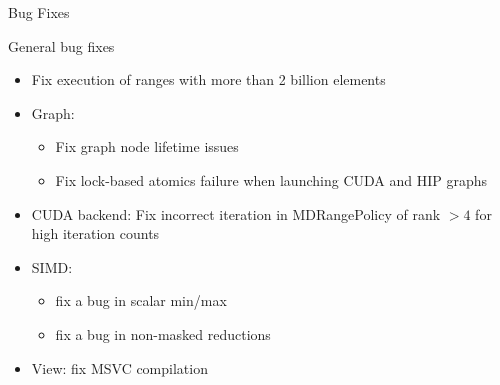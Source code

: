 




\begin{frame}[fragile]

  {\Huge Bug Fixes}

  \vspace{10pt}

\end{frame}

\begin{frame}[fragile]{General bug fixes}
  \begin{itemize}
      \item Fix execution of ranges with more than 2 billion elements
      \item Graph:
      \begin{itemize}
        \item Fix graph node lifetime issues
        \item Fix lock-based atomics failure when launching CUDA and HIP graphs
      \end{itemize}
      \item CUDA backend: Fix incorrect iteration in MDRangePolicy of rank $> 4$ for high iteration counts
      \item SIMD:
      \begin{itemize}
        \item fix a bug in scalar min/max
        \item fix a bug in non-masked reductions
      \end{itemize}
      \item View: fix MSVC compilation
  \end{itemize}
 \end{frame}

